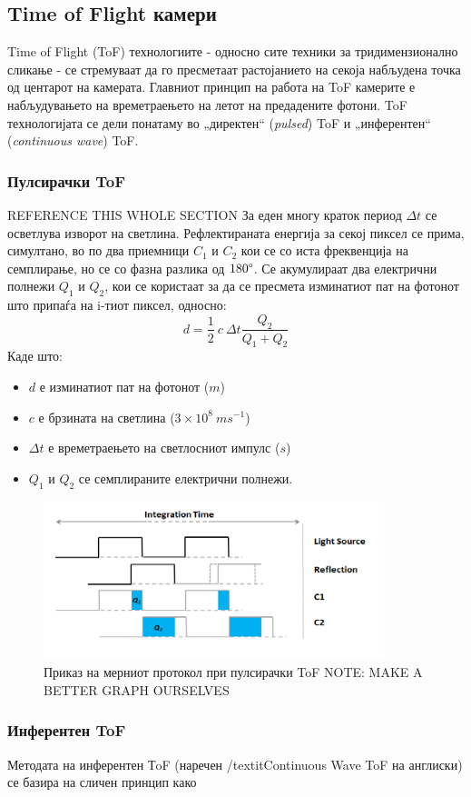 \documentclass{article}
\begin{document}
\subsection{Time of Flight камери}
Time of Flight (ToF) технологиите - односно сите техники за тридимензионално сликање - се стремуваат да го пресметаат растојанието на секоја набљудена точка од центарот на камерата. Главниот принцип на работа на ToF камерите е набљудувањето на времетраењето на летот на предадените фотони. ToF технологијата се дели понатаму во „директен“ (\textit{pulsed}) ToF и „инферентен“ (\textit{continuous wave}) ToF.
\subsubsection{Пулсирачки ToF}
REFERENCE THIS WHOLE SECTION
За еден многу краток период $ \Delta t $ се осветлува изворот на светлина. Рефлектираната енергија за секој пиксел се прима, симултано, во по два приемници $C_1$ и $C_2$ кои се со иста фреквенција на семплирање, но се со фазна разлика од $180 \degree$. Се акумулираат два електрични полнежи $Q_1$ и  $Q_2$, кои се користаат за да се пресмета изминатиот пат на фотонот што припаѓа на i-тиот пиксел, односно:
$$ d = \frac{1}{2} \ c\  \Delta t \frac{Q_2}{Q_1 + Q_2} $$
Каде што:
\begin{itemize}
\item $d$ е изминатиот пат на фотонот ($m$)
\item $c$ е брзината на светлина ($ 3 \times 10^8\ ms^{-1} $)
\item $\Delta t$ е времетраењето на светлосниот импулс ($s$)
\item $Q_1$ и $Q_2$ се семплираните електрични полнежи.
\end{itemize} 

\begin{figure}[H]
\includegraphics[width=0.5\linewidth]{./images/impulseToF.png}
\centering
\caption{Приказ на мерниот протокол при пулсирачки ToF NOTE: MAKE A BETTER GRAPH OURSELVES}
\label{fig:impulseToF.png}
\end{figure}

\subsubsection{Инферентен ToF}
Методата на инферентен ТoF (наречен /textit{Continuous Wave ToF} на англиски) се базира на сличен принцип како 
  
\end{document}
